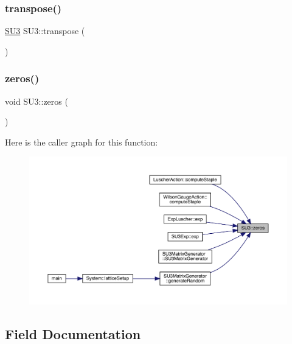 \mbox{\label{class_s_u3_af0229a4940c6c4355a2994ccaa663d0e}} 
\subsubsection{\texorpdfstring{transpose()}{transpose()}}
{\footnotesize\ttfamily \mbox{\hyperlink{class_s_u3}{S\+U3}} S\+U3\+::transpose (\begin{DoxyParamCaption}{ }\end{DoxyParamCaption})}

\mbox{\label{class_s_u3_a9f3527fd882882ddfa18d72f5f43176c}} 
\subsubsection{\texorpdfstring{zeros()}{zeros()}}
{\footnotesize\ttfamily void S\+U3\+::zeros (\begin{DoxyParamCaption}{ }\end{DoxyParamCaption})}

Here is the caller graph for this function\+:\nopagebreak
\begin{figure}[H]
\begin{center}
\leavevmode
\includegraphics[width=350pt]{class_s_u3_a9f3527fd882882ddfa18d72f5f43176c_icgraph}
\end{center}
\end{figure}


\subsection{Field Documentation}
\mbox{\label{class_s_u3_af003668305abe616f56568a075434be0}} 

